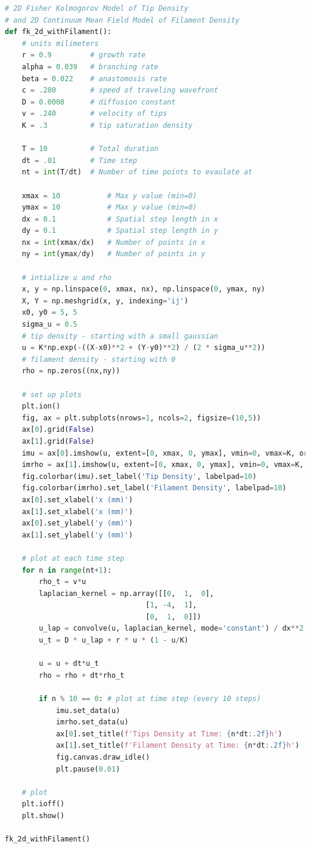 \documentclass{article}
\begin{document}
\hypertarget{fk_2d_withFilament}{}
\begin{lstlisting}[language=Python, caption=2D Fisher Kolmogorov (Tips) with Continuum Mean Field Model (Filament) Code]
# 2D Fisher Kolmogorov Model of Tip Density
# and 2D Continuum Mean Field Model of Filament Density
def fk_2d_withFilament():
    # units milimeters
    r = 0.9         # growth rate
    alpha = 0.039   # branching rate
    beta = 0.022    # anastomosis rate 
    c = .280        # speed of traveling wavefront
    D = 0.0008      # diffusion constant 
    v = .240        # velocity of tips
    K = .3          # tip saturation density
    
    T = 10          # Total duration
    dt = .01        # Time step
    nt = int(T/dt)  # Number of time points to evaulate at
    
    xmax = 10           # Max y value (min=0)
    ymax = 10           # Max y value (min=0)
    dx = 0.1            # Spatial step length in x
    dy = 0.1            # Spatial step length in y
    nx = int(xmax/dx)   # Number of points in x
    ny = int(ymax/dy)   # Number of points in y

    # intialize u and rho
    x, y = np.linspace(0, xmax, nx), np.linspace(0, ymax, ny)
    X, Y = np.meshgrid(x, y, indexing='ij')
    x0, y0 = 5, 5
    sigma_u = 0.5 
    # tip density - starting with a small gaussian
    u = K*np.exp(-((X-x0)**2 + (Y-y0)**2) / (2 * sigma_u**2))
    # filament density - starting with 0
    rho = np.zeros((nx,ny))

    # set up plots
    plt.ion()
    fig, ax = plt.subplots(nrows=1, ncols=2, figsize=(10,5))
    ax[0].grid(False)
    ax[1].grid(False)
    imu = ax[0].imshow(u, extent=[0, xmax, 0, ymax], vmin=0, vmax=K, origin='lower', cmap='plasma')
    imrho = ax[1].imshow(u, extent=[0, xmax, 0, ymax], vmin=0, vmax=K, origin='lower', cmap='plasma')
    fig.colorbar(imu).set_label('Tip Density', labelpad=10)
    fig.colorbar(imrho).set_label('Filament Density', labelpad=10)
    ax[0].set_xlabel('x (mm)')
    ax[1].set_xlabel('x (mm)')
    ax[0].set_ylabel('y (mm)')
    ax[1].set_ylabel('y (mm)')
 
    # plot at each time step
    for n in range(nt+1):
        rho_t = v*u
        laplacian_kernel = np.array([[0,  1,  0],
                                 [1, -4,  1],
                                 [0,  1,  0]])
        u_lap = convolve(u, laplacian_kernel, mode='constant') / dx**2
        u_t = D * u_lap + r * u * (1 - u/K)

        u = u + dt*u_t
        rho = rho + dt*rho_t
        
        if n % 10 == 0: # plot at time step (every 10 steps)
            imu.set_data(u)
            imrho.set_data(u)
            ax[0].set_title(f'Tips Density at Time: {n*dt:.2f}h')
            ax[1].set_title(f'Filament Density at Time: {n*dt:.2f}h')
            fig.canvas.draw_idle()
            plt.pause(0.01)

    # plot
    plt.ioff()
    plt.show()

fk_2d_withFilament()
\end{lstlisting}
\end{document}
